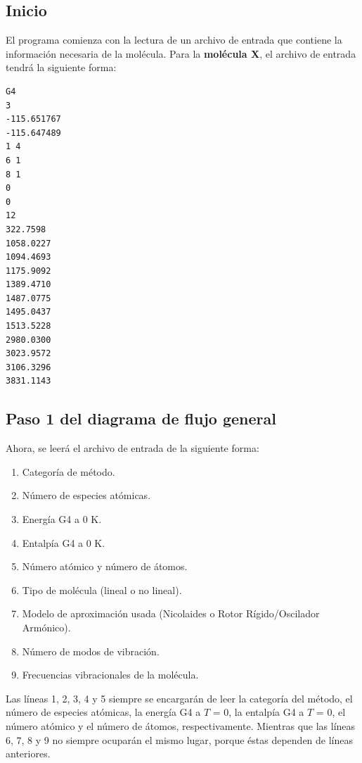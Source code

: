 \subsection {Inicio}

El programa comienza con la lectura de un archivo de entrada que contiene la información necesaria de la molécula. Para la \textbf{molécula X}, el archivo de entrada tendrá la siguiente forma:

\begin{lstlisting}[caption = Output de CH3OH-G4.txt]
G4
3
-115.651767
-115.647489
1 4
6 1
8 1
0
0
12
322.7598
1058.0227
1094.4693
1175.9092
1389.4710
1487.0775
1495.0437
1513.5228
2980.0300
3023.9572
3106.3296
3831.1143
\end{lstlisting}



\subsection{Paso 1 del diagrama de flujo general}

Ahora, se leerá el archivo de entrada de la siguiente forma:
\begin{multicols}{2}
\begin{enumerate}		
	\item Categoría de método. 
	\item Número de especies atómicas.
	\item Energía G4 a 0 K.
	\item Entalpía G4 a 0 K.
	\item Número atómico y número de átomos.
	\item Tipo de molécula (lineal o no lineal).
	\item Modelo de aproximación usada (Nicolaides o Rotor Rígido/Oscilador Armónico).
	\item Número de modos de vibración.
	\item Frecuencias vibracionales de la molécula.
\end{enumerate}
\end{multicols}

Las líneas 1, 2, 3, 4 y 5 siempre se encargarán de leer la categoría del método, el número de especies atómicas, la energía G4 a $T$ = 0, la entalpía G4 a $T$ = 0, el número atómico y el número de átomos, respectivamente. Mientras que las líneas 6, 7, 8 y 9 no siempre ocuparán el mismo lugar, porque éstas dependen de líneas anteriores.\\

\newpage

